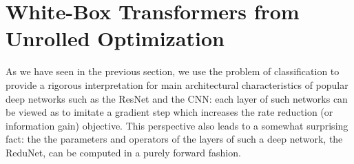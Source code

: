 \documentclass[\toplevelprefix/book-main.tex]{subfiles}
\begin{document}
 




\section{White-Box Transformers from Unrolled Optimization}\label{sec:chap4-white-box-transformer}
As we have seen in the previous section, we use the problem of classification to provide a rigorous interpretation for main architectural characteristics of popular deep networks such as the ResNet and the CNN: each layer of such networks can be viewed as to imitate a gradient step which increases the rate reduction (or information gain) objective. This perspective also leads to a somewhat surprising fact: the the parameters and operators  of the layers of such a deep network, the ReduNet, can be  computed in a purely forward fashion.
\end{document}
